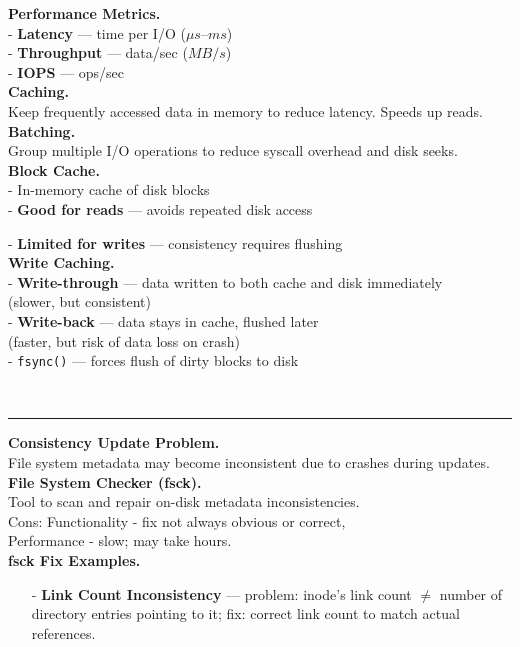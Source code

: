 \documentclass[8pt]{extarticle}
\begin{document}
\begin{minipage}[t]{0.5\textwidth}
\begin{minipage}[t]{0.48\textwidth}
\noindent\textbf{Performance Metrics.}\\
- \textbf{Latency} — time per I/O ($\mu s$–$ms$)\\
- \textbf{Throughput} — data/sec ($MB/s$)\\
- \textbf{IOPS} — ops/sec\\
\noindent\textbf{Caching.} \\
Keep frequently accessed data in memory to reduce latency. Speeds up reads.\\
\noindent\textbf{Batching.} \\
Group multiple I/O operations to reduce syscall overhead and disk seeks.\\
\noindent\textbf{Block Cache.}\\
- In-memory cache of disk blocks\\
- \textbf{Good for reads} — avoids repeated disk access\\
\end{minipage}
\hfill
\begin{minipage}[t]{0.48\textwidth}\vspace{5px}
- \textbf{Limited for writes} — consistency requires flushing\\
\noindent\textbf{Write Caching.}\\
- \textbf{Write-through} — data written to both cache and disk immediately\\
  (slower, but consistent)\\
- \textbf{Write-back} — data stays in cache, flushed later\\
  (faster, but risk of data loss on crash)\\
- \texttt{fsync()} — forces flush of dirty blocks to disk\\
\end{minipage}\\[-7px]\hrule\vspace{3px}
\noindent\textbf{Consistency Update Problem.} \\
File system metadata may become inconsistent due to crashes during updates.\\
\noindent\textbf{File System Checker (fsck).} \\
Tool to scan and repair on-disk metadata inconsistencies.\\
Cons: Functionality - fix not always obvious or correct, \\Performance - slow; may take hours.\\
\noindent\textbf{fsck Fix Examples.}
\begin{itemize}[noitemsep,topsep=0pt]
    \item[-] \textbf{Link Count Inconsistency} — problem: inode's link count $\neq$ number of directory entries pointing to it; fix: correct link count to match actual references.
    

\end{itemize}
\end{minipage}
\end{document}
